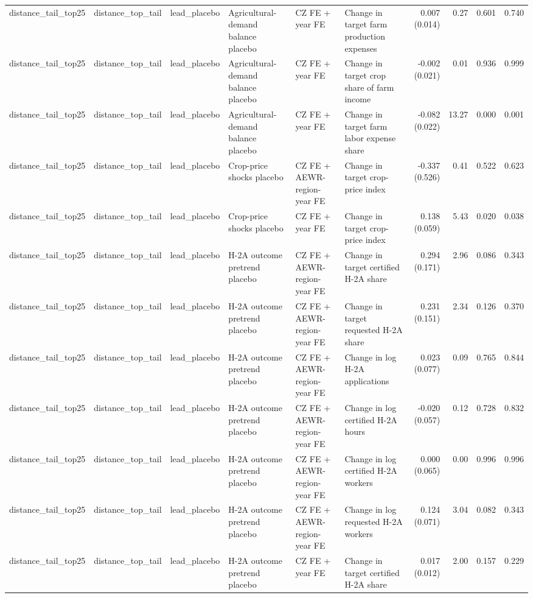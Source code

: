 \begin{tabular}{llllllrrrr}
distance_tail_top25 & distance_top_tail & lead_placebo & Agricultural-demand balance placebo & CZ FE + year FE & Change in target farm production expenses & 0.007 (0.014) & 0.27 & 0.601 & 0.740 \\
distance_tail_top25 & distance_top_tail & lead_placebo & Agricultural-demand balance placebo & CZ FE + year FE & Change in target crop share of farm income & -0.002 (0.021) & 0.01 & 0.936 & 0.999 \\
distance_tail_top25 & distance_top_tail & lead_placebo & Agricultural-demand balance placebo & CZ FE + year FE & Change in target farm labor expense share & -0.082 (0.022) & 13.27 & 0.000 & 0.001 \\
distance_tail_top25 & distance_top_tail & lead_placebo & Crop-price shocks placebo & CZ FE + AEWR-region-year FE & Change in target crop-price index & -0.337 (0.526) & 0.41 & 0.522 & 0.623 \\
distance_tail_top25 & distance_top_tail & lead_placebo & Crop-price shocks placebo & CZ FE + year FE & Change in target crop-price index & 0.138 (0.059) & 5.43 & 0.020 & 0.038 \\
distance_tail_top25 & distance_top_tail & lead_placebo & H-2A outcome pretrend placebo & CZ FE + AEWR-region-year FE & Change in target certified H-2A share & 0.294 (0.171) & 2.96 & 0.086 & 0.343 \\
distance_tail_top25 & distance_top_tail & lead_placebo & H-2A outcome pretrend placebo & CZ FE + AEWR-region-year FE & Change in target requested H-2A share & 0.231 (0.151) & 2.34 & 0.126 & 0.370 \\
distance_tail_top25 & distance_top_tail & lead_placebo & H-2A outcome pretrend placebo & CZ FE + AEWR-region-year FE & Change in log H-2A applications & 0.023 (0.077) & 0.09 & 0.765 & 0.844 \\
distance_tail_top25 & distance_top_tail & lead_placebo & H-2A outcome pretrend placebo & CZ FE + AEWR-region-year FE & Change in log certified H-2A hours & -0.020 (0.057) & 0.12 & 0.728 & 0.832 \\
distance_tail_top25 & distance_top_tail & lead_placebo & H-2A outcome pretrend placebo & CZ FE + AEWR-region-year FE & Change in log certified H-2A workers & 0.000 (0.065) & 0.00 & 0.996 & 0.996 \\
distance_tail_top25 & distance_top_tail & lead_placebo & H-2A outcome pretrend placebo & CZ FE + AEWR-region-year FE & Change in log requested H-2A workers & 0.124 (0.071) & 3.04 & 0.082 & 0.343 \\
distance_tail_top25 & distance_top_tail & lead_placebo & H-2A outcome pretrend placebo & CZ FE + year FE & Change in target certified H-2A share & 0.017 (0.012) & 2.00 & 0.157 & 0.229 \\

\end{tabular}
